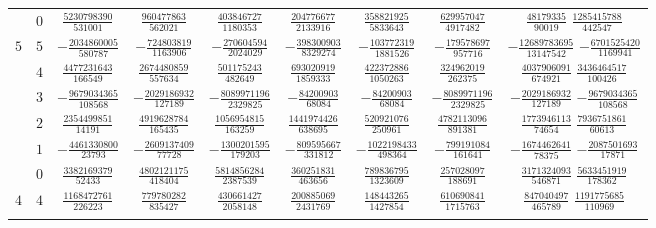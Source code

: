 \begin{table}
\begin{center}
\begin{tabular}{ccccccccc}
           &  $0$  &  $ \frac{ 5230798390}{ 531001} $  &  $ \frac{  960477863}{  562021}$  &  $ \frac{ 403846727}{ 1180353} $  &  $ \frac{ 204776677}{ 2133916}$  &  $ \frac{ 358821925}{ 5833643}$  &  $ \frac{ 629957047}{ 4917482} $  &  $ \frac{   48179335}{   90019}$  $ \frac{ 1285415788}{ 442547}$  \\ \addlinespace
      $5$  &  $5$  &  $-\frac{ 2034860005}{ 580787} $  &  $-\frac{  724803819}{ 1163906}$  &  $-\frac{ 270604594}{ 2024029} $  &  $-\frac{ 398300903}{ 8329274}$  &  $-\frac{ 103772319}{ 1881526}$  &  $-\frac{ 179578697}{  957716} $  &  $-\frac{12689783695}{13147542}$  $-\frac{ 6701525420}{1169941}$  \\ \addlinespace
           &  $4$  &  $ \frac{ 4477231643}{ 166549} $  &  $ \frac{ 2674480859}{  557634}$  &  $ \frac{ 501175243}{  482649} $  &  $ \frac{ 693020919}{ 1859333}$  &  $ \frac{ 422372886}{ 1050263}$  &  $ \frac{ 324962019}{  262375} $  &  $ \frac{ 4037906091}{  674921}$  $ \frac{ 3436464517}{ 100426}$  \\ \addlinespace
           &  $3$  &  $-\frac{ 9679034365}{ 108568} $  &  $-\frac{ 2029186932}{  127189}$  &  $-\frac{8089971196}{ 2329825} $  &  $-\frac{  84200903}{   68084}$  &  $-\frac{  84200903}{   68084}$  &  $-\frac{8089971196}{ 2329825} $  &  $-\frac{ 2029186932}{  127189}$  $-\frac{ 9679034365}{ 108568}$  \\ \addlinespace
           &  $2$  &  $ \frac{ 2354499851}{  14191} $  &  $ \frac{ 4919628784}{  165435}$  &  $ \frac{1056954815}{  163259} $  &  $ \frac{1441974426}{  638695}$  &  $ \frac{ 520921076}{  250961}$  &  $ \frac{4782113096}{  891381} $  &  $ \frac{ 1773946113}{   74654}$  $ \frac{ 7936751861}{  60613}$  \\ \addlinespace
           &  $1$  &  $-\frac{ 4461330800}{  23793} $  &  $-\frac{ 2609137409}{   77728}$  &  $-\frac{1300201595}{  179203} $  &  $-\frac{ 809595667}{  331812}$  &  $-\frac{1022198433}{  498364}$  &  $-\frac{ 799191084}{  161641} $  &  $-\frac{ 1674462641}{   78375}$  $-\frac{ 2087501693}{  17871}$  \\ \addlinespace
           &  $0$  &  $ \frac{ 3382169379}{  52433} $  &  $ \frac{ 4802121175}{  418404}$  &  $ \frac{5814856284}{ 2387539} $  &  $ \frac{ 360251831}{  463656}$  &  $ \frac{ 789836795}{ 1323609}$  &  $ \frac{ 257028097}{  188691} $  &  $ \frac{ 3171324093}{  546871}$  $ \frac{ 5633451919}{ 178362}$  \\ \addlinespace
      $4$  &  $4$  &  $ \frac{ 1168472761}{ 226223} $  &  $ \frac{  779780282}{  835427}$  &  $ \frac{ 430661427}{ 2058148} $  &  $ \frac{ 200885069}{ 2431769}$  &  $ \frac{ 148443265}{ 1427854}$  &  $ \frac{ 610690841}{ 1715763} $  &  $ \frac{  847040497}{  465789}$  $ \frac{ 1191775685}{ 110969}$  \\ \addlinespace

\end{tabular}
\end{center}
\end{table}
